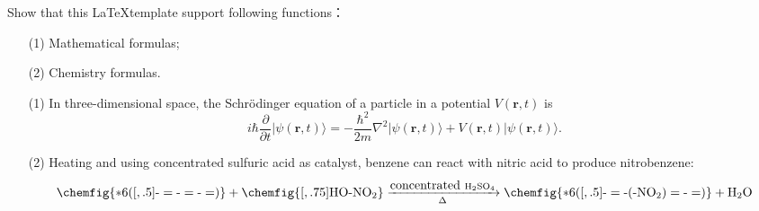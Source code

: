 \documentclass[en, twoside]{assignment}
\begin{document}
    \begin{prob}
        Show that this \LaTeX template support following functions：
        \begin{itemize}
            \item[(1)] Mathematical formulas;
            \item[(2)] Chemistry formulas.
        \end{itemize}
    \end{prob}
    \begin{pf}
        \begin{itemize}
            \item[(1)] In three-dimensional space, the Schrödinger equation of a particle in a potential $V(\bm{r},t)$ is
            \begin{equation}
                i\hbar\frac{\partial}{\partial t}\lvert\psi(\bm{r},t)\rangle=-\frac{\hbar^2}{2m}\nabla^2\lvert\psi(\bm{r},t)\rangle+V(\bm{r},t)\lvert\psi(\bm{r},t)\rangle.
            \end{equation}
            \item[(2)] Heating and using concentrated sulfuric acid as catalyst, benzene can react with nitric acid to produce nitrobenzene:
            \begin{equation}
                \ce{\chemfig{*6([,.5]-=-=-=)} + \chemfig{[,.75]HO-NO_2} ->[\mbox{concentrated }H2SO4][$\Delta$] \chemfig{*6([,.5]-=-(-NO_2)=-=)} + H2O}
            \end{equation}
        \end{itemize}
    \end{pf}

    \clearpage
\end{document}
